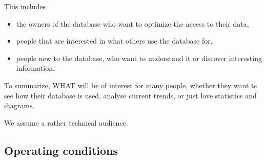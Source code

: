 This includes
\begin{itemize}
  \item the owners of the \gls{database} who want to optimize the access to
  	their data,
  	
  \item people that are interested in what others use the \gls{database} for,

  
  \item people new to the \gls{database}, who want to understand it or discover interesting information.

\end{itemize}
To summarize, WHAT will be of interest for many people, 
whether they want to see how their \gls{database} is used, analyse current trends,
or just love statistics and \glspl{diagram}.

%   
%   




We assume a rather technical audience.
 
 

\subsection{Operating conditions}

